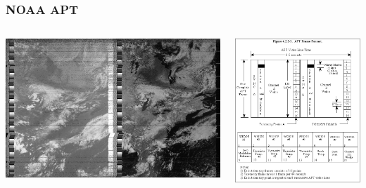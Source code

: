 \documentclass[]{beamer}
\begin{document}
\begin{frame}
    \frametitle{NOAA APT}
    \begin{columns}[T]
        \begin{column}[T]{5cm}
            \includegraphics[width=0.45\paperwidth,height=0.7\paperheight]{images/noaa-19-sbs.jpg}
        \end{column}
        \begin{column}[T]{5cm}
            \includegraphics[height=0.5\paperwidth]{images/NOAA_APT_Frame_Format.png}
        \end{column}
    \end{columns}
\end{frame}
\end{document}
